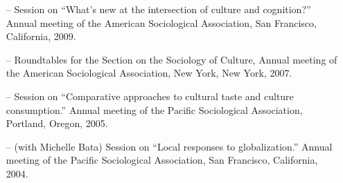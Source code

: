\begin{itemize}[itemsep=-0.5ex]
    \item[--] Session on ``What's new at the intersection of culture and cognition?'' Annual meeting of the American Sociological Association, San Francisco, California, 2009.
    
    \item[--] Roundtables for the Section on the Sociology of Culture, Annual meeting of the American Sociological Association, New York, New York, 2007.
    
    \item[--] Session on ``Comparative approaches to cultural taste and culture consumption.'' Annual meeting of the Pacific Sociological Association, Portland, Oregon, 2005.
    
    \item[--] (with Michelle Bata) Session on ``Local responses to globalization.'' Annual meeting of the Pacific Sociological Association, San Francisco, California, 2004.
\end{itemize}